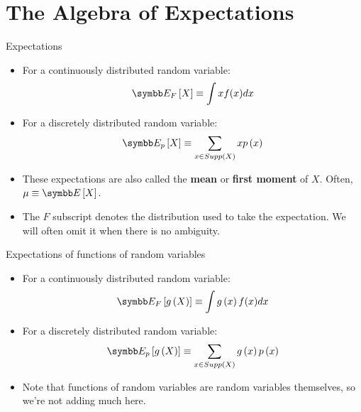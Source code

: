 \documentclass[aspectratio=169,11pt]{beamer}
\begin{document}
\section{The Algebra of Expectations}

\begin{frame}{Expectations}
\begin{itemize}
	\item For a continuously distributed random variable:\[
		\E_F \left[ X \right] \equiv \int xf(x)dx
	\]
	
	\medskip
	\item For a discretely distributed random variable:\[
		\E_p \left[ X \right] \equiv \sum_{x\in Supp\left(X\right)} x p\left(x\right)
	\]
	
	\medskip
	\item These expectations are also called the {\bf mean} or {\bf first moment} of $X$. Often, $\mu\equiv \E\left[X\right]$.
		
	\medskip
	\item The $F$ subscript denotes the distribution used to take the expectation. We will often omit it when there is no ambiguity.
\end{itemize}
\end{frame}


\begin{frame}{Expectations of functions of random variables}
\begin{itemize}
	\item For a continuously distributed random variable:\[
		\E_F \left[ g\left(X\right) \right] \equiv \int g\left(x\right)f(x)dx
	\]
	
	\medskip
	\item For a discretely distributed random variable:\[
		\E_p \left[ g\left(X\right) \right] \equiv \sum_{x\in Supp\left(X\right)} g\left(x\right) p\left(x\right)
	\]
	
	\medskip
	\item Note that functions of random variables are random variables themselves, so we're not adding much here.

\end{itemize}
\end{frame}
\end{document}
